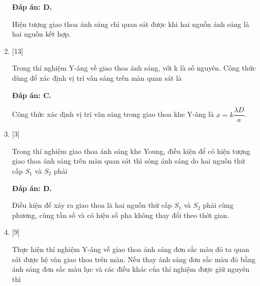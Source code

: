 \begin{enumerate}[label=\bfseries Câu \arabic*:]
	\loigiai
	{		\textbf{Đáp án: D.}
		
		Hiện tượng giao thoa ánh sáng chỉ quan sát được khi hai nguồn ánh sáng là hai nguồn kết hợp.
		
	}
	
	\item {} [13]
	\cauhoi
	{Trong thí nghiệm Y-âng về giao thoa ánh sáng, với k là số nguyên. Công thức dùng để xác định vị trí vân sáng trên màn quan sát là
	}
	
	\loigiai
	{		\textbf{Đáp án: C.}
		
		Công thức xác định vị trí vân sáng trong giao thoa khe Y-âng là $x= k \dfrac{\lambda D}{a}$.
		
	}
	

	
	\item {} [3]
	\cauhoi
	{Trong thí nghiệm giao thoa ánh sáng khe Young, điều kiện để có hiện tượng giao thoa ánh sáng trên màn quan sát thì sóng ánh sáng do hai nguồn thứ cấp $S_{1}$ và $S_{2}$ phải
	}
	
	\loigiai
	{		\textbf{Đáp án: D.}
		
		Điều kiện để xảy ra giao thoa là hai nguồn thứ cấp $S_{1}$ và $S_{2}$ phải cùng phương, cùng tần số và có hiệu số pha không thay đổi theo thời gian.
		
	}
	

	\item {} [9]
	\cauhoi
	{Thực hiện thí nghiệm Y-âng về giao thoa ánh sáng đơn sắc màu đỏ ta quan sát được hệ vân giao thoa trên màn. Nếu thay ánh sáng đơn sắc màu đỏ bằng ánh sáng đơn sắc màu lục và các điều khác của thí nghiệm được giữ nguyên thì 
	}
	

\end{enumerate}
